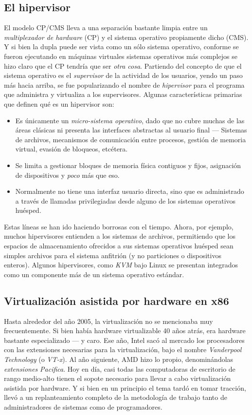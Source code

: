 \documentclass[11pt,fleqn]{book} %
\begin{document}
\subsection{El hipervisor}
\label{sec-9-3-1}


El modelo CP/CMS lleva a una separación bastante limpia entre un
\emph{multiplexador de hardware} (CP) y el sistema operativo propiamente
dicho (CMS). Y si bien la dupla puede ser vista como un sólo sistema
operativo, conforme se fueron ejecutando en máquinas virtuales
sistemas operativos más complejos se hizo claro que el CP tendría que
ser \emph{otra cosa}. Partiendo del concepto de que el sistema operativo
es el \emph{supervisor} de la actividad de los usuarios, yendo un paso más
hacia arriba, se fue popularizando el nombre de \emph{hipervisor} para el
programa que administra y virtualiza a los supervisores. Algunas
características primarias que definen qué es un hipervisor son:

\begin{itemize}
\item Es únicamente un \emph{micro-sistema operativo}, dado que no cubre
  muchas de las áreas clásicas ni presenta las interfaces abstractas
  al usuario final — Sistemas de archivos, mecanismos de comunicación
  entre procesos, gestión de memoria virtual, evasión de bloqueos,
  etcétera.
\item Se limita a gestionar bloques de memoria física contiguos y fijos,
  asignación de dispositivos y \emph{poco} más que eso.
\item Normalmente no tiene una interfaz usuario directa, sino que es
  administrado a través de llamadas privilegiadas desde alguno de los
  sistemas operativos huésped.
\end{itemize}

Estas líneas se han ido haciendo borrosas con el tiempo. Ahora,
por ejemplo, muchos hipervisores entienden a los sistemas de archivos,
permitiendo que los espacios de almacenamiento ofrecidos a sus
sistemas operativos huésped sean simples archivos para el sistema
anfitrión (y no particiones o dispositivos enteros). Algunos
hipervisores, como \emph{KVM} bajo Linux se presentan integrados como un
componente más de un sistema operativo estándar.
\subsection{Virtualización asistida por hardware en x86}
\label{sec-9-3-2}


Hasta alrededor del año 2005, la virtualización no se mencionaba muy
frecuentemente. Si bien había hardware virtualizable 40 años atrás,
era hardware bastante especializado — y caro. Ese año, Intel sacó al
mercado los procesadores con las extensiones necesarias para la
virtualización, bajo el nombre \emph{Vanderpool Technology} (o \emph{VT-x}). Al
año siguiente, AMD hizo lo propio, denominándolas \emph{extensiones Pacifica}. Hoy en día, casi todas las computadoras de escritorio de
rango medio-alto tienen el sopote necesario para llevar a cabo
virtualización asistida por hardware. Y si bien en un principio el
tema tardó en tomar tracción, llevó a un replanteamiento completo de
la metodología de trabajo tanto de administradores de sistemas como
de programadores.
\end{document}
